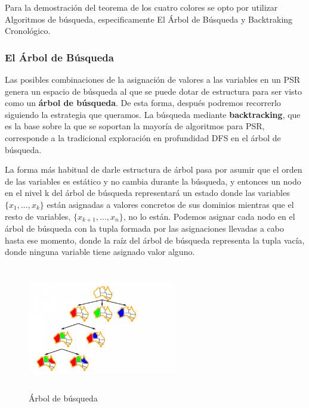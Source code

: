 \documentclass[a4paper]{article}
\begin{document}
Para la demostración del teorema de los cuatro colores se opto por utilizar Algoritmos de búsqueda, especificamente El Árbol de Búsqueda y Backtraking Cronológico.

\subsubsection*{El Árbol de Búsqueda}

Las posibles combinaciones de la asignación de valores a las variables en un PSR genera un espacio de búsqueda al que se puede dotar de estructura para ser visto como un \textbf{árbol de búsqueda}. De esta forma, después podremos recorrerlo siguiendo la estrategia que queramos. La búsqueda mediante \textbf{backtracking}, que es la base sobre la que se soportan la mayoría de algoritmos para PSR, corresponde a la tradicional exploración en profundidad DFS en el árbol de búsqueda.

La forma más habitual de darle estructura de árbol pasa por asumir que el orden de las variables es estático y no cambia durante la búsqueda, y entonces un nodo en el nivel k
del árbol de búsqueda representará un estado donde las variables $\{x_1,...,x_k\}$ están asignadas a valores concretos de sus dominios mientras que el resto de variables, $\{x_{k+1},...,x_n\}$, no lo están. Podemos asignar cada nodo en el árbol de búsqueda con la tupla formada por las asignaciones llevadas a cabo hasta ese momento, donde la raíz del árbol de búsqueda representa la tupla vacía, donde ninguna variable tiene asignado valor alguno.\\
 
\begin{figure}
	\centering
	\includegraphics[width=6.5cm,height=5.5cm]{psr-tree.png}
	\caption{Árbol de búsqueda}
	\label{fig:myfig}
\end{figure}
\end{document}
